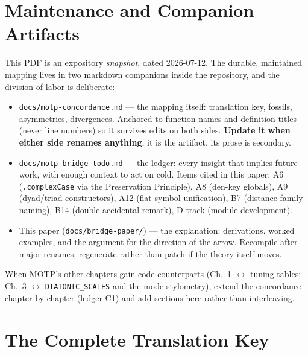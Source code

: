 \documentclass[11pt]{article}
\theoremstyle{definition}
\theoremstyle{remark}
\newcommand{\code}[1]{\texttt{#1}}
\newcommand{\file}[1]{\texttt{#1}}
\begin{document}
\section{Maintenance and Companion Artifacts}\label{sec:maintenance}

This PDF is an expository \emph{snapshot}, dated 2026-07-12. The durable,
maintained mapping lives in two markdown companions inside the repository, and
the division of labor is deliberate:

\begin{itemize}[leftmargin=2em]
  \item \file{docs/motp-concordance.md} --- the mapping itself: translation
        key, fossils, asymmetries, divergences. Anchored to function names and
        definition titles (never line numbers) so it survives edits on both
        sides. \textbf{Update it when either side renames anything}; it is the
        artifact, its prose is secondary.
  \item \file{docs/motp-bridge-todo.md} --- the ledger: every insight that
        implies future work, with enough context to act on cold. Items cited in
        this paper: A6 (\code{.complexCase} via the Preservation Principle),
        A8 (den-key globals), A9 (dyad/triad constructors), A12 (flat-symbol
        unification), B7 (distance-family naming), B14 (double-accidental
        remark), D-track (module development).
  \item This paper (\file{docs/bridge-paper/}) --- the explanation: derivations,
        worked examples, and the argument for the direction of the arrow.
        Recompile after major renames; regenerate rather than patch if the
        theory itself moves.
\end{itemize}

When MOTP's other chapters gain code counterparts (Ch.~1 $\leftrightarrow$
tuning tables; Ch.~3 $\leftrightarrow$ \code{DIATONIC\_SCALES} and the mode
stylometry), extend the concordance chapter by chapter (ledger C1) and add
sections here rather than interleaving.

\appendix
\section{The Complete Translation Key}\label{app:translation}
\end{document}
